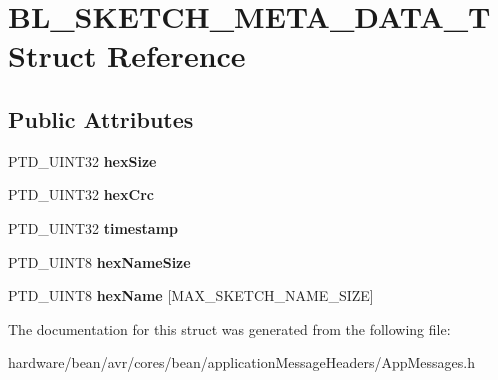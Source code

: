 \hypertarget{struct_b_l___s_k_e_t_c_h___m_e_t_a___d_a_t_a___t}{}\section{B\+L\+\_\+\+S\+K\+E\+T\+C\+H\+\_\+\+M\+E\+T\+A\+\_\+\+D\+A\+T\+A\+\_\+T Struct Reference}
\label{struct_b_l___s_k_e_t_c_h___m_e_t_a___d_a_t_a___t}
\subsection*{Public Attributes}
\begin{DoxyCompactItemize}
\item 
P\+T\+D\+\_\+\+U\+I\+N\+T32 {\bfseries hex\+Size}\hypertarget{struct_b_l___s_k_e_t_c_h___m_e_t_a___d_a_t_a___t_a9e51f84ff4b61da949d9d08efe5633a7}{}\label{struct_b_l___s_k_e_t_c_h___m_e_t_a___d_a_t_a___t_a9e51f84ff4b61da949d9d08efe5633a7}

\item 
P\+T\+D\+\_\+\+U\+I\+N\+T32 {\bfseries hex\+Crc}\hypertarget{struct_b_l___s_k_e_t_c_h___m_e_t_a___d_a_t_a___t_a4baaf0e3cba8d7e1d7200a32531f3db4}{}\label{struct_b_l___s_k_e_t_c_h___m_e_t_a___d_a_t_a___t_a4baaf0e3cba8d7e1d7200a32531f3db4}

\item 
P\+T\+D\+\_\+\+U\+I\+N\+T32 {\bfseries timestamp}\hypertarget{struct_b_l___s_k_e_t_c_h___m_e_t_a___d_a_t_a___t_a2650b9923e0acb1cdb4ebef3541657c5}{}\label{struct_b_l___s_k_e_t_c_h___m_e_t_a___d_a_t_a___t_a2650b9923e0acb1cdb4ebef3541657c5}

\item 
P\+T\+D\+\_\+\+U\+I\+N\+T8 {\bfseries hex\+Name\+Size}\hypertarget{struct_b_l___s_k_e_t_c_h___m_e_t_a___d_a_t_a___t_a9f08c868a16dac0f0430c9115d817178}{}\label{struct_b_l___s_k_e_t_c_h___m_e_t_a___d_a_t_a___t_a9f08c868a16dac0f0430c9115d817178}

\item 
P\+T\+D\+\_\+\+U\+I\+N\+T8 {\bfseries hex\+Name} \mbox{[}M\+A\+X\+\_\+\+S\+K\+E\+T\+C\+H\+\_\+\+N\+A\+M\+E\+\_\+\+S\+I\+ZE\mbox{]}\hypertarget{struct_b_l___s_k_e_t_c_h___m_e_t_a___d_a_t_a___t_a17019df0616eba02dd2fc22402740ba6}{}\label{struct_b_l___s_k_e_t_c_h___m_e_t_a___d_a_t_a___t_a17019df0616eba02dd2fc22402740ba6}

\end{DoxyCompactItemize}


The documentation for this struct was generated from the following file\+:\begin{DoxyCompactItemize}
\item 
hardware/bean/avr/cores/bean/application\+Message\+Headers/App\+Messages.\+h\end{DoxyCompactItemize}
